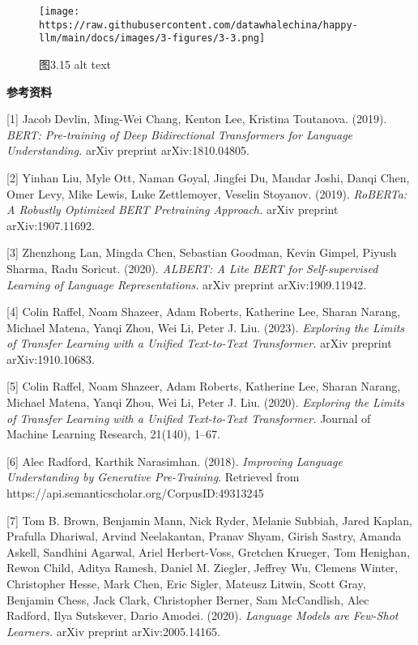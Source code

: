 \documentclass[12pt,a4paper]{book}
\begin{document}
\begin{figure}[htbp]\centering
\texttt{[image: https://raw.githubusercontent.com/datawhalechina/happy-llm/main/docs/images/3-figures/3-3.png]}
\caption{图3.15 alt text}
\end{figure}

\textbf{参考资料}

{[}1{]} Jacob Devlin, Ming-Wei Chang, Kenton Lee, Kristina Toutanova.
(2019). \emph{BERT: Pre-training of Deep Bidirectional Transformers for
Language Understanding.} arXiv preprint arXiv:1810.04805.

{[}2{]} Yinhan Liu, Myle Ott, Naman Goyal, Jingfei Du, Mandar Joshi,
Danqi Chen, Omer Levy, Mike Lewis, Luke Zettlemoyer, Veselin Stoyanov.
(2019). \emph{RoBERTa: A Robustly Optimized BERT Pretraining Approach.}
arXiv preprint arXiv:1907.11692.

{[}3{]} Zhenzhong Lan, Mingda Chen, Sebastian Goodman, Kevin Gimpel,
Piyush Sharma, Radu Soricut. (2020). \emph{ALBERT: A Lite BERT for
Self-supervised Learning of Language Representations.} arXiv preprint
arXiv:1909.11942.

{[}4{]} Colin Raffel, Noam Shazeer, Adam Roberts, Katherine Lee, Sharan
Narang, Michael Matena, Yanqi Zhou, Wei Li, Peter J. Liu. (2023).
\emph{Exploring the Limits of Transfer Learning with a Unified
Text-to-Text Transformer.} arXiv preprint arXiv:1910.10683.

{[}5{]} Colin Raffel, Noam Shazeer, Adam Roberts, Katherine Lee, Sharan
Narang, Michael Matena, Yanqi Zhou, Wei Li, Peter J. Liu. (2020).
\emph{Exploring the Limits of Transfer Learning with a Unified
Text-to-Text Transformer.} Journal of Machine Learning Research,
21(140), 1--67.

{[}6{]} Alec Radford, Karthik Narasimhan. (2018). \emph{Improving
Language Understanding by Generative Pre-Training}. Retrieved from
https://api.semanticscholar.org/CorpusID:49313245

{[}7{]} Tom B. Brown, Benjamin Mann, Nick Ryder, Melanie Subbiah, Jared
Kaplan, Prafulla Dhariwal, Arvind Neelakantan, Pranav Shyam, Girish
Sastry, Amanda Askell, Sandhini Agarwal, Ariel Herbert-Voss, Gretchen
Krueger, Tom Henighan, Rewon Child, Aditya Ramesh, Daniel M. Ziegler,
Jeffrey Wu, Clemens Winter, Christopher Hesse, Mark Chen, Eric Sigler,
Mateusz Litwin, Scott Gray, Benjamin Chess, Jack Clark, Christopher
Berner, Sam McCandlish, Alec Radford, Ilya Sutskever, Dario Amodei.
(2020). \emph{Language Models are Few-Shot Learners.} arXiv preprint
arXiv:2005.14165.
\end{document}
